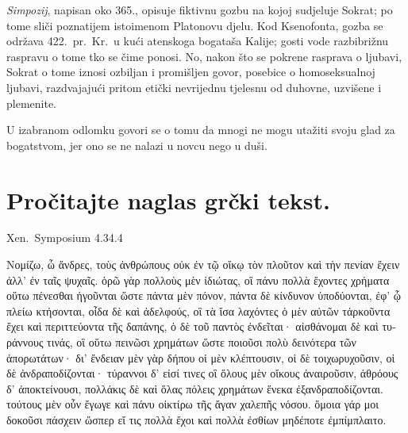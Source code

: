 \textit{Simpozij}, napisan oko 365., opisuje fiktivnu gozbu na kojoj sudjeluje Sokrat; po tome sliči poznatijem istoimenom Platonovu djelu. Kod Ksenofonta, gozba se održava 422.\ pr.~Kr.\ u kući atenskoga bogataša Kalije; gosti vode razbibrižnu raspravu o tome tko se čime ponosi. No, nakon što se pokrene rasprava o ljubavi, Sokrat o tome iznosi ozbiljan i promišljen govor, posebice o homoseksualnoj ljubavi, razdvajajući pritom etički nevrijednu tjelesnu od duhovne, uzvišene i plemenite. 

U izabranom odlomku govori se o tomu da mnogi ne mogu utažiti svoju glad za bogatstvom, jer ono se ne nalazi u novcu nego u duši.


\section*{Pročitajte naglas grčki tekst.}

Xen.\ Symposium 4.34.4


\medskip

{\large
\begin{greek}
\noindent Νομίζω, ὦ ἄνδρες, τοὺς ἀνθρώπους οὐκ ἐν τῷ οἴκῳ τὸν πλοῦτον καὶ τὴν πενίαν ἔχειν ἀλλ' ἐν ταῖς ψυχαῖς. ὁρῶ γὰρ πολλοὺς μὲν ἰδιώτας, οἳ πάνυ πολλὰ ἔχοντες χρήματα οὕτω πένεσθαι ἡγοῦνται ὥστε πάντα μὲν πόνον, πάντα δὲ κίνδυνον ὑποδύονται, ἐφ' ᾧ πλείω κτήσονται, οἶδα δὲ καὶ ἀδελφούς, οἳ τὰ ἴσα λαχόντες ὁ μὲν αὐτῶν τἀρκοῦντα ἔχει καὶ περιττεύοντα τῆς δαπάνης, ὁ δὲ τοῦ παντὸς ἐνδεῖται· αἰσθάνομαι δὲ καὶ τυράννους τινάς, οἳ οὕτω πεινῶσι χρημάτων ὥστε ποιοῦσι πολὺ δεινότερα τῶν ἀπορωτάτων· δι' ἔνδειαν μὲν γὰρ δήπου οἱ μὲν κλέπτουσιν, οἱ δὲ τοιχωρυχοῦσιν, οἱ δὲ ἀνδραποδίζονται· τύραννοι δ' εἰσί τινες οἳ ὅλους μὲν οἴκους ἀναιροῦσιν, ἁθρόους δ' ἀποκτείνουσι, πολλάκις δὲ καὶ ὅλας πόλεις χρημάτων ἕνεκα ἐξανδραποδίζονται. τούτους μὲν οὖν ἔγωγε καὶ πάνυ οἰκτίρω τῆς ἄγαν χαλεπῆς νόσου. ὅμοια γάρ μοι δοκοῦσι πάσχειν ὥσπερ εἴ τις πολλὰ ἔχοι καὶ πολλὰ ἐσθίων μηδέποτε ἐμπίμπλαιτο.

\end{greek}

}

